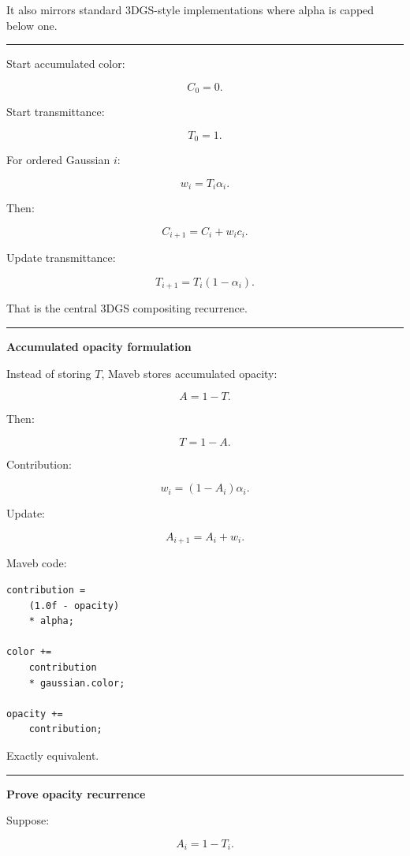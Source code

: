 It also mirrors standard 3DGS-style implementations where alpha is capped below one.

\begin{center}\rule{0.5\linewidth}{0.5pt}\end{center}

Start accumulated color:

\[
C_0=0.
\]

Start transmittance:

\[
T_0=1.
\]

For ordered Gaussian \(i\):

\[
\boxed{
w_i=
T_i\alpha_i.
}
\]

Then:

\[
\boxed{
C_{i+1}
=
C_i
+
w_i c_i.
}
\]

Update transmittance:

\[
\boxed{
T_{i+1}
=
T_i(1-\alpha_i).
}
\]

That is the central 3DGS compositing recurrence.

\begin{center}\rule{0.5\linewidth}{0.5pt}\end{center}

\textbf{Accumulated opacity formulation}

Instead of storing \(T\), Maveb stores accumulated opacity:

\[
A=1-T.
\]

Then:

\[
T=1-A.
\]

Contribution:

\[
\boxed{
w_i=
(1-A_i)\alpha_i.
}
\]

Update:

\[
A_{i+1}
=
A_i+w_i.
\]

Maveb code:

\begin{verbatim}
contribution =
    (1.0f - opacity)
    * alpha;

color +=
    contribution
    * gaussian.color;

opacity +=
    contribution;
\end{verbatim}

Exactly equivalent.

\begin{center}\rule{0.5\linewidth}{0.5pt}\end{center}

\textbf{Prove opacity recurrence}

Suppose:

\[
A_i=1-T_i.
\]

